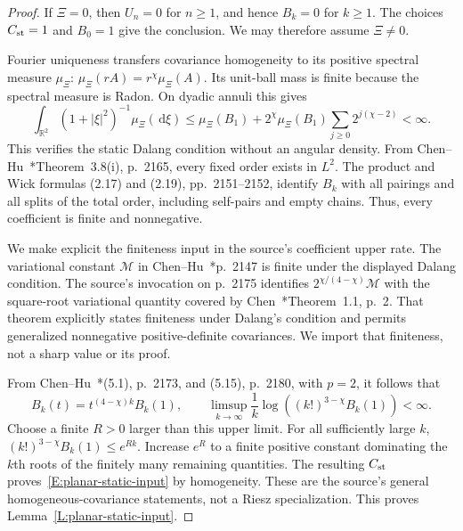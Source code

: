 \documentclass[12pt]{article}
\numberwithin{equation}{section}
\theoremstyle{definition}
\newcommand{\R}{\mathbb{R}}
\newcommand{\ud}{\,\mathrm{d}}
\begin{document}
\begin{proof}
  If $\Xi=0$, then $U_n=0$ for $n\ge1$, and hence $B_k=0$ for
  $k\ge1$. The choices $C_{\rm st}=1$ and $B_0=1$ give the
  conclusion. We may therefore assume $\Xi\ne0$.

  Fourier uniqueness transfers covariance homogeneity to its positive
  spectral measure $\mu_\Xi$:
  $\mu_\Xi(rA)=r^\chi\mu_\Xi(A)$. Its unit-ball mass is finite
  because the spectral measure is Radon. On dyadic annuli this gives
  \[
    \int_{\R^2}(1+|\xi|^2)^{-1}\mu_\Xi(\ud\xi)
    \le\mu_\Xi(B_1)
    +2^\chi\mu_\Xi(B_1)\sum_{j\ge0}2^{j(\chi-2)}<\infty.
  \]
  This verifies the static Dalang condition without an angular density.
  From Chen--Hu~\cite{chen.hu:25:hyperbolic}*{Theorem~3.8(i), p.~2165},
  every fixed order exists in $L^2$. The product and Wick formulas
  (2.17) and (2.19), pp.~2151--2152, identify $B_k$ with all pairings
  and all splits of the total order, including self-pairs and empty
  chains. Thus, every coefficient is finite and nonnegative.

  We make explicit the finiteness input in the source's coefficient
  upper rate. The variational constant $\mathcal{M}$ in
  Chen--Hu~\cite{chen.hu:25:hyperbolic}*{p.~2147} is finite under the
  displayed Dalang condition. The source's invocation on p.~2175
  identifies $2^{\chi/(4-\chi)}\mathcal{M}$ with the square-root
  variational quantity covered by
  Chen~\cite{chen:23:exponential}*{Theorem~1.1, p.~2}.
  That theorem explicitly states finiteness under Dalang's condition
  and permits generalized nonnegative positive-definite covariances.
  We import that finiteness, not a sharp value or its proof.

  From Chen--Hu~\cite{chen.hu:25:hyperbolic}*{(5.1), p.~2173,
  and (5.15), p.~2180}, with $p=2$, it follows that
  \[
    B_k(t)=t^{(4-\chi)k}B_k(1),\qquad
    \limsup_{k\to\infty}\frac1k
    \log\left((k!)^{3-\chi}B_k(1)\right)<\infty.
  \]
  Choose a finite $R>0$ larger than this upper limit. For all sufficiently
  large $k$, $(k!)^{3-\chi}B_k(1)\le e^{Rk}$. Increase $e^R$ to a
  finite positive constant dominating the $k$th roots of the finitely
  many remaining quantities. The resulting $C_{\rm st}$
  proves~\eqref{E:planar-static-input} by homogeneity. These are the source's
  general homogeneous-covariance statements, not a Riesz specialization.
  This proves Lemma~\ref{L:planar-static-input}.
\end{proof}
\end{document}
